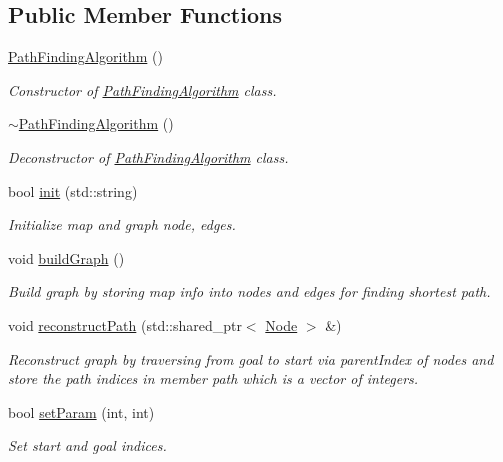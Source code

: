 \subsection*{Public Member Functions}
\begin{DoxyCompactItemize}
\item 
\hyperlink{classPathFindingAlgorithm_ad9af1fa0b8bb6dc6660219c0b21a3749}{Path\-Finding\-Algorithm} ()
\begin{DoxyCompactList}\small\item\em Constructor of \hyperlink{classPathFindingAlgorithm}{Path\-Finding\-Algorithm} class. \end{DoxyCompactList}\item 
\hyperlink{classPathFindingAlgorithm_a68fdd88d9348febf0e1814af9add5ca3}{$\sim$\-Path\-Finding\-Algorithm} ()
\begin{DoxyCompactList}\small\item\em Deconstructor of \hyperlink{classPathFindingAlgorithm}{Path\-Finding\-Algorithm} class. \end{DoxyCompactList}\item 
bool \hyperlink{classPathFindingAlgorithm_a02dabb2f15ac242896b502d0eedf5537}{init} (std\-::string)
\begin{DoxyCompactList}\small\item\em Initialize map and graph node, edges. \end{DoxyCompactList}\item 
void \hyperlink{classPathFindingAlgorithm_a71b876665f35f458137ff9f2347fcc54}{build\-Graph} ()
\begin{DoxyCompactList}\small\item\em Build graph by storing map info into nodes and edges for finding shortest path. \end{DoxyCompactList}\item 
void \hyperlink{classPathFindingAlgorithm_abea0e189da3910ad823fb64d69e76b71}{reconstruct\-Path} (std\-::shared\-\_\-ptr$<$ \hyperlink{classNode}{Node} $>$ \&)
\begin{DoxyCompactList}\small\item\em Reconstruct graph by traversing from goal to start via parent\-Index of nodes and store the path indices in member path which is a vector of integers. \end{DoxyCompactList}\item 
bool \hyperlink{classPathFindingAlgorithm_a2b48e12615aecc6fd952efcb5d920864}{set\-Param} (int, int)
\begin{DoxyCompactList}\small\item\em Set start and goal indices. \end{DoxyCompactList}\item 

\end{DoxyCompactItemize}
